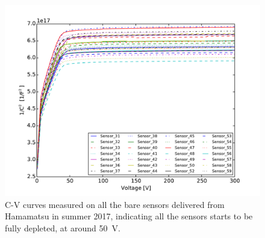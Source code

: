 \documentclass[conference]{IEEEtran}
\begin{document}
\begin{figure}[!ht]%
  \centering
  \includegraphics[width=1.0\linewidth]{pics/All_sensors_CV.pdf}
  \caption{C-V curves measured on all the bare sensors delivered from Hamamatsu in summer 2017, indicating all the sensors starts to be fully depleted, at around \SI{50}{\volt}.}%
\label{fig:2}%
\end{figure}
\end{document}
